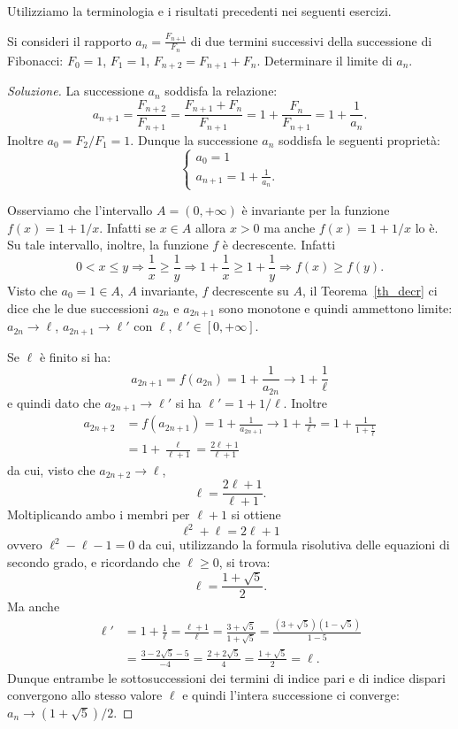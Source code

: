 Utilizziamo la terminologia e i risultati precedenti nei seguenti
esercizi.

\begin{exercise}[Fibonacci]\label{ex_fibonacci}%
%
%
  Si consideri il rapporto $a_n = \frac{F_{n+1}}{F_n}$ di due termini
  successivi della successione di Fibonacci: $F_0=1$, $F_1=1$,
  $F_{n+2} = F_{n+1} + F_n$. Determinare il limite di $a_n$.
\end{exercise}

\begin{proof}[Soluzione]
  La successione $a_n$ soddisfa la relazione:
  \[
   a_{n+1} = \frac{F_{n+2}}{F_{n+1}} = \frac{F_{n+1}+F_n}{F_{n+1}} = 1
   + \frac{F_n}{F_{n+1}} = 1 + \frac{1}{a_n}.
   \]
   Inoltre $a_0=F_2 / F_1 = 1$. Dunque la successione $a_n$ soddisfa
   le seguenti proprietà:
   \[
   \begin{cases}
     a_0 = 1 \\
     a_{n+1} = 1 + \frac{1}{a_n}.
   \end{cases}
   \]

   Osserviamo che l'intervallo $A=(0,+\infty)$ è invariante per la
   funzione $f(x) = 1+1/x$. Infatti
   se $x\in A$ allora $x>0$ ma anche $f(x) = 1+1/x$ lo è.
   Su tale intervallo, inoltre, la funzione $f$ è decrescente. Infatti
   \[
   0 < x \le y \Rightarrow \frac 1 x \ge \frac 1 y \Rightarrow 1+\frac
   1 x \ge 1 + \frac 1 y
   \Rightarrow f(x) \ge f(y).
   \]
   Visto che $a_0 = 1 \in A$, $A$ invariante, $f$ decrescente su $A$,
   il Teorema~\ref{th_decr} ci dice che le due successioni $a_{2n}$ e
   $a_{2n+1}$ sono monotone e quindi ammettono limite: $a_{2n}\to
   \ell$, $a_{2n+1} \to \ell'$ con $\ell,\ell' \in [0,+\infty]$.

   Se $\ell$ è finito si ha:
   \[
   a_{2n+1} = f(a_{2n}) = 1+ \frac{1}{a_{2n}} \to 1 + \frac{1}{\ell}
   \]
   e quindi dato che $a_{2n+1}\to \ell'$ si ha $\ell' = 1 + 1/\ell$.
   Inoltre
   \begin{align*}
   a_{2n+2} &= f(a_{2n+1}) = 1 + \frac{1}{a_{2n+1}} \to 1 +
   \frac{1}{\ell'}
   = 1 + \frac{1}{1+\frac{1}{\ell}} \\
   & = 1 + \frac{\ell}{\ell+1}
   = \frac{2\ell +1}{\ell +1}
   \end{align*}
   da cui, visto che $a_{2n+2}\to \ell$,
   \[
   \ell = \frac{2\ell +1 }{\ell +1}.
   \]
   Moltiplicando ambo i membri per $\ell+1$ si ottiene
   \[
    \ell^2 + \ell = 2\ell + 1
    \]
    ovvero $\ell^2 - \ell -1 =0$ da cui, utilizzando la formula
    risolutiva delle equazioni di secondo grado, e ricordando che
    $\ell \ge 0$, si trova:
    \[
    \ell = \frac{1 + \sqrt{5}}{2}.
    \]
    Ma anche
    \begin{align*}
    \ell' &= 1 + \frac 1 \ell = \frac{\ell + 1}{\ell} = \frac{3+\sqrt
      5}{1 + \sqrt 5} = \frac{(3+\sqrt 5)(1-\sqrt 5)}{1-5} \\
     &= \frac{3-2\sqrt 5-5}{-4} = \frac{2+2\sqrt 5}{4} = \frac{1+\sqrt
       5}{2} = \ell.
    \end{align*}
    Dunque entrambe le sottosuccessioni dei termini di indice pari e
    di indice dispari convergono allo stesso valore $\ell$ e quindi
    l'intera successione ci converge: $a_n\to (1+\sqrt 5)/2$.


\end{proof}
